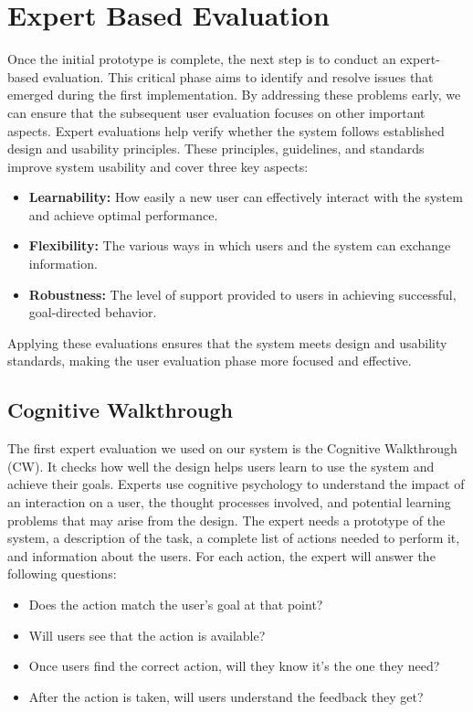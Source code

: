 \section{Expert Based Evaluation}
Once the initial prototype is complete, the next step is to conduct an expert-based evaluation. This critical phase aims to identify and resolve issues that emerged during the first implementation. By addressing these problems early, we can ensure that the subsequent user evaluation focuses on other important aspects.\newline\newline
Expert evaluations help verify whether the system follows established design and usability principles. These principles, guidelines, and standards improve system usability and cover three key aspects:
\begin{itemize}
	\item \textbf{Learnability:} How easily a new user can effectively interact with the system and achieve optimal performance.
	\item \textbf{Flexibility:} The various ways in which users and the system can exchange information.
	\item \textbf{Robustness:} The level of support provided to users in achieving successful, goal-directed behavior.
\end{itemize}
Applying these evaluations ensures that the system meets design and usability standards, making the user evaluation phase more focused and effective.
\subsection{Cognitive Walkthrough}
The first expert evaluation we used on our system is the Cognitive Walkthrough (CW). It checks how well the design helps users learn to use the system and achieve their goals. Experts use cognitive psychology to understand the impact of an interaction on a user, the thought processes involved, and potential learning problems that may arise from the design.
\newline
The expert needs a prototype of the system, a description of the task, a complete list of actions needed to perform it, and information about the users. For each action, the expert will answer the following questions:
\begin{itemize}
	\item Does the action match the user’s goal at that point?
	\item Will users see that the action is available?
	\item Once users find the correct action, will they know it’s the one they need?
	\item After the action is taken, will users understand the feedback they get?
\end{itemize}
\clearpage

